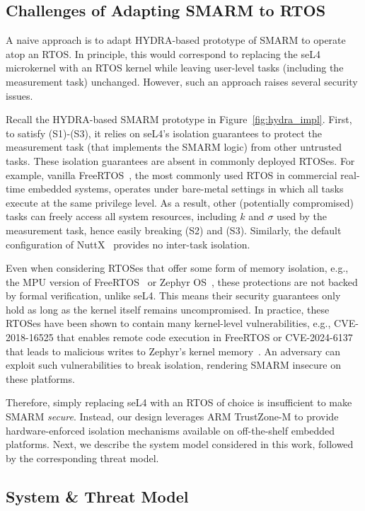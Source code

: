 \documentclass{ieeeaccess}
\begin{document}
\subsection{Challenges of Adapting SMARM to RTOS}\label{subsec:naive}

A naive approach is to adapt HYDRA-based prototype of SMARM to operate atop an RTOS.
In principle, this would correspond to replacing the seL4 microkernel with an RTOS kernel while leaving user-level tasks (including the measurement task) unchanged.
However, such an approach raises several security issues.


Recall the HYDRA-based SMARM prototype in Figure~\ref{fig:hydra_impl}.
First, to satisfy (S1)-(S3), it relies on seL4's isolation guarantees to protect the measurement task (that implements the SMARM logic) from other untrusted tasks.
These isolation guarantees are absent in commonly deployed RTOSes.
For example, vanilla FreeRTOS~\cite{freertos}, the most commonly used RTOS in commercial real-time embedded systems, operates under bare-metal settings in which all tasks execute at the same privilege level.
As a result, other (potentially compromised) tasks can freely access all system resources, including $k$ and $\sigma$ used by the measurement task, hence easily breaking (S2) and (S3).
Similarly, the default configuration of NuttX~\cite{nuttx} provides no inter-task isolation.

Even when considering RTOSes that offer some form of memory isolation, e.g., the MPU version of FreeRTOS~\cite{freertos-mpu} or Zephyr OS~\cite{zephyr}, these protections are not backed by formal verification, unlike seL4.
This means their security guarantees only hold as long as the kernel itself remains uncompromised.
In practice, these RTOSes have been shown to contain many kernel-level vulnerabilities, e.g., CVE-2018-16525 that enables remote code execution in FreeRTOS or CVE-2024-6137 that leads to malicious writes to Zephyr's kernel memory~\cite{cve_freertos_rce,cve_zephyr_memory}.
An adversary can exploit such vulnerabilities to break isolation, rendering SMARM insecure on these platforms.

Therefore, simply replacing seL4 with an RTOS of choice is insufficient to make SMARM \emph{secure}.
Instead, our design leverages ARM TrustZone-M to provide hardware-enforced isolation mechanisms available on off-the-shelf embedded platforms.
Next, we describe the system model considered in this work, followed by the corresponding threat model.


\subsection{System \& Threat Model}
\end{document}
